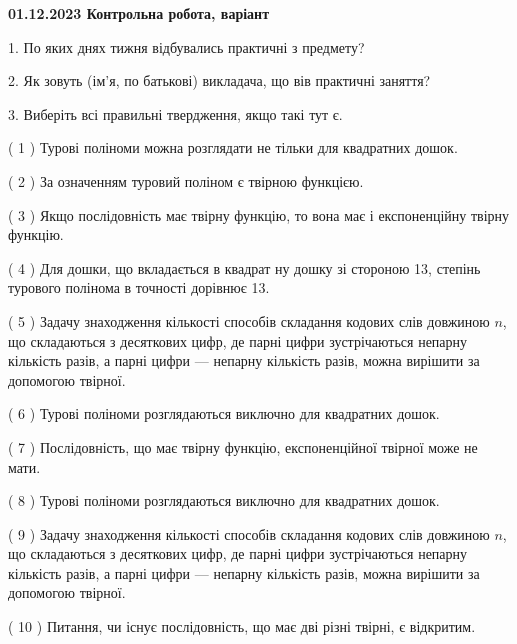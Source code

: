 \documentclass[12pt, ukrainian]{article}
\begin{document}
\vspace{4mm}
\newpage
\begin {large}

\textbf{01.12.2023 Контрольна робота, варіант  }\par


{
1. По яких днях тижня відбувались практичні з предмету?



\vspace{5mm}
2. Як зовуть (ім'я, по батькові) викладача, що вів практичні заняття?



\vspace{5mm}
3. Виберіть всі правильні твердження, якщо такі тут є.\par
\vspace{2mm}
( 1 ) Турові поліноми можна розглядати не тільки для квадратних дошок.%

( 2 ) За означенням туровий поліном є твірною функцією.%

( 3 ) Якщо послідовність має твірну функцію, то вона має і експоненційну твірну функцію.%

( 4 ) Для дошки, що вкладається в квадрат ну дошку зі стороною 13, степінь турового полінома в точності дорівнює 13.%

( 5 ) Задачу знаходження кількості способів складання кодових слів довжиною $n$, що складаються з десяткових цифр, де парні цифри зустрічаються непарну кількість разів, а парні цифри — непарну кількість разів, можна вирішити за допомогою твірної.%

( 6 ) Турові поліноми розглядаються виключно для квадратних дошок.%

( 7 ) Послідовність, що має твірну функцію, експоненційної твірної може не мати.%

( 8 ) Турові поліноми розглядаються виключно для квадратних дошок.%

( 9 ) Задачу знаходження кількості способів складання кодових слів довжиною $n$, що складаються з десяткових цифр, де парні цифри зустрічаються непарну кількість разів, а парні цифри — непарну кількість разів, можна вирішити за допомогою твірної.%

( 10 ) Питання, чи існує послідовність, що має дві різні твірні, є відкритим.%
}
\end {large}
\end{document}
